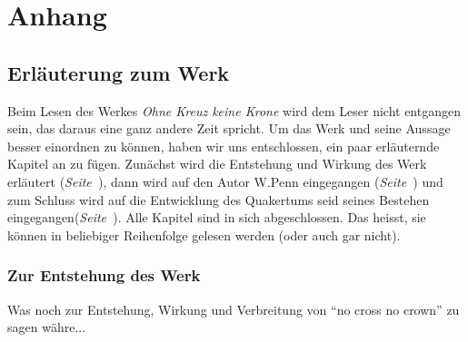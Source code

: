 \documentclass[a5paper,pagesize,9pt]{scrbook}
\begin{document}
\part{Anhang}
\chapter{Erläuterung zum Werk}

Beim Lesen des Werkes \textit{Ohne Kreuz keine Krone} wird dem Leser nicht
entgangen sein, das daraus eine ganz andere Zeit spricht. Um das Werk und seine
Aussage besser einordnen zu können, haben wir uns entschlossen, ein paar
erläuternde Kapitel an zu fügen. Zunächst wird die Entstehung und Wirkung des
Werk erläutert (\textit{Seite~\pageref{ref:zum_werk}}), dann wird auf den Autor
W.Penn eingegangen (\textit{Seite~\pageref{ref:zum_autor_penn}}) und zum Schluss
wird auf die Entwicklung des Quakertums seid seines Bestehen
eingegangen(\textit{Seite~\pageref{ref:entwicklung_quakertum}}). Alle Kapitel
sind in sich abgeschlossen. Das heisst, sie können in beliebiger Reihenfolge
gelesen werden (oder auch gar nicht).


\section{Zur Entstehung des Werk}\label{ref:zum_werk}

Was noch zur Entstehung, Wirkung und Verbreitung von "`no cross no crown"' zu
sagen währe...




\printindex


\pagebreak 
\vspace{\fill}

\pagebreak 
\end{document}
